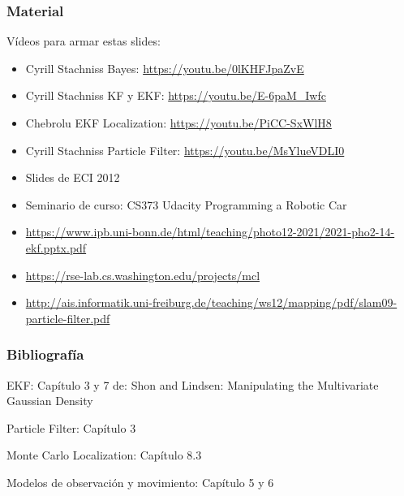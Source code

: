 \begin{frame}
    \frametitle{Material}
    
    Vídeos para armar estas slides:
    \begin{itemize}
        \item Cyrill Stachniss Bayes: \url{https://youtu.be/0lKHFJpaZvE} 
        \item Cyrill Stachniss KF y EKF: \url{https://youtu.be/E-6paM_Iwfc}
        \item Chebrolu EKF Localization: \url{https://youtu.be/PiCC-SxWlH8}
        \item Cyrill Stachniss Particle Filter: \url{https://youtu.be/MsYlueVDLI0}
        \item Slides de ECI 2012
        \item Seminario de curso: CS373 Udacity Programming a Robotic Car
        \item \url{https://www.ipb.uni-bonn.de/html/teaching/photo12-2021/2021-pho2-14-ekf.pptx.pdf}
        \item \url{https://rse-lab.cs.washington.edu/projects/mcl}
        \item \url{http://ais.informatik.uni-freiburg.de/teaching/ws12/mapping/pdf/slam09-particle-filter.pdf}
    \end{itemize}
    
\end{frame}

\begin{frame}
	\frametitle{Bibliografía}
	
	EKF:
    Capítulo 3 y 7 de: \cite{thrun2005probabilistic}
	Shon and Lindsen: Manipulating the Multivariate Gaussian Density

    Particle Filter:
    Capítulo 3 \cite{thrun2005probabilistic}

    Monte Carlo Localization:
    Capítulo 8.3 \cite{thrun2005probabilistic}

    Modelos de observación y movimiento:
    Capítulo 5 y 6 \cite{thrun2005probabilistic}
	
	\printbibliography
	
\end{frame}